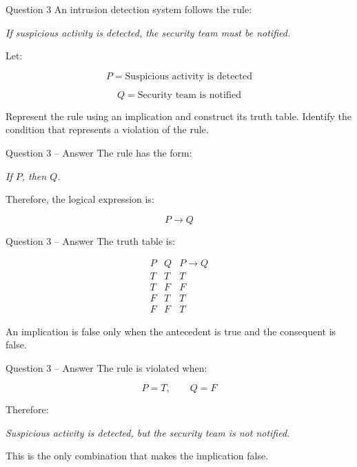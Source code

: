 \begin{frame}{Question 3}
An intrusion detection system follows the rule:

\begin{center}
\textit{If suspicious activity is detected, the security team must be notified.}
\end{center}

Let:

$$
P = \text{Suspicious activity is detected}
$$

$$
Q = \text{Security team is notified}
$$

Represent the rule using an implication and construct its truth table.
Identify the condition that represents a violation of the rule.
\end{frame}

\begin{frame}{Question 3 -- Answer}
The rule has the form:

\begin{center}
\textit{If $P$, then $Q$.}
\end{center}

Therefore, the logical expression is:

$$
P \rightarrow Q
$$

\end{frame}

\begin{frame}{Question 3 -- Answer}
The truth table is:

$$
\begin{matrix}
P & Q & P\rightarrow Q \\
T & T & T \\
T & F & F \\
F & T & T \\
F & F & T
\end{matrix}
$$

An implication is false only when the antecedent is true and the
consequent is false.
\end{frame}

\begin{frame}{Question 3 -- Answer}
The rule is violated when:

$$
P=T,\qquad Q=F
$$

Therefore:

\begin{center}
\textit{Suspicious activity is detected, but the security team is not notified.}
\end{center}

This is the only combination that makes the implication false.
\end{frame}

